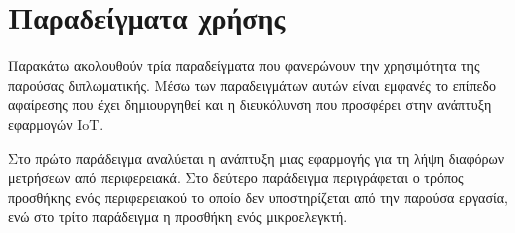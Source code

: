 \section{Παραδείγματα χρήσης}
\label{sec:intro}

Παρακάτω ακολουθούν τρία παραδείγματα που φανερώνουν την χρησιμότητα της παρούσας διπλωματικής. Μέσω των παραδειγμάτων αυτών είναι εμφανές το επίπεδο αφαίρεσης που έχει δημιουργηθεί και η διευκόλυνση που προσφέρει στην ανάπτυξη εφαρμογών IoT. 

Στο πρώτο παράδειγμα αναλύεται η ανάπτυξη μιας εφαρμογής για τη λήψη διαφόρων μετρήσεων από περιφερειακά. Στο δεύτερο παράδειγμα περιγράφεται ο τρόπος προσθήκης ενός περιφερειακού το οποίο δεν υποστηρίζεται από την παρούσα εργασία, ενώ στο τρίτο παράδειγμα η προσθήκη ενός μικροελεγκτή.